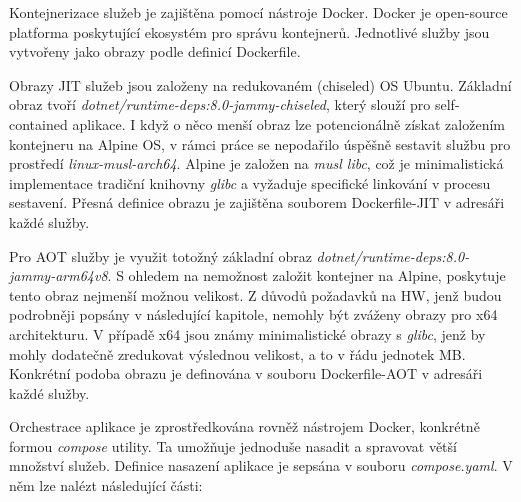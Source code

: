 

Kontejnerizace služeb je zajištěna pomocí nástroje Docker. Docker je open-source platforma poskytující ekosystém pro správu kontejnerů. Jednotlivé služby jsou vytvořeny jako obrazy podle definicí Dockerfile. 

Obrazy JIT služeb jsou založeny na redukovaném (chiseled) OS Ubuntu. Základní obraz tvoří \emph{dotnet/runtime-deps:8.0-jammy-chiseled}, který slouží pro self-contained aplikace. I když o něco menší obraz lze potencionálně získat založením kontejneru na Alpine OS, v rámci práce se nepodařilo úspěšně sestavit službu pro prostředí \emph{linux-musl-arch64}. Alpine je založen na \emph{musl libc}, což je minimalistická implementace tradiční knihovny \emph{glibc} a vyžaduje specifické linkování v procesu sestavení. Přesná definice obrazu je zajištěna souborem Dockerfile-JIT v adresáři každé služby.

Pro AOT služby je využit totožný základní obraz \emph{dotnet/runtime-deps:8.0-jammy-arm64v8}. S ohledem na nemožnost založit kontejner na Alpine, poskytuje tento obraz nejmenší možnou velikost. Z důvodů požadavků na HW, jenž budou podrobněji popsány v následující kapitole, nemohly být zváženy obrazy pro x64 architekturu. V případě x64 jsou známy minimalistické obrazy s \emph{glibc}, jenž by mohly dodatečně zredukovat výslednou velikost, a to v řádu jednotek MB. Konkrétní podoba obrazu je definována v souboru Dockerfile-AOT v adresáři každé služby.


Orchestrace aplikace je zprostředkována rovněž nástrojem Docker, konkrétně formou \emph{compose} utility. Ta umožňuje jednoduše nasadit a spravovat větší množství služeb. Definice nasazení aplikace je sepsána v souboru \emph{compose.yaml}. V něm lze nalézt následující části:

